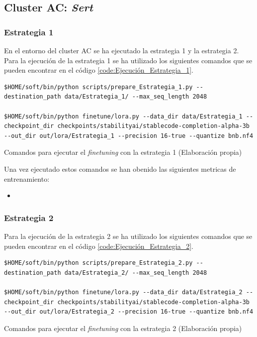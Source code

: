 \subsection{Cluster AC: \textit{Sert}}
\label{subsec:cluster_ac_ejecucion}

\subsubsection{Estrategia 1}
\label{subsubsec:cluster_ac_ejecucion:estrategia_1}

En el entorno del cluster AC se ha ejecutado la estrategia 1 y la estrategia 2. Para la
ejecución de la estrategia 1 se ha utilizado los siguientes comandos que se pueden encontrar
en el código \ref{code:Ejecución_Estrategia_1}.

\begin{mycode}
    \begin{verbatim}
$HOME/soft/bin/python scripts/prepare_Estrategia_1.py --destination_path data/Estrategia_1/ --max_seq_length 2048

$HOME/soft/bin/python finetune/lora.py --data_dir data/Estrategia_1 --checkpoint_dir checkpoints/stabilityai/stablecode-completion-alpha-3b --out_dir out/lora/Estrategia_1 --precision 16-true --quantize bnb.nf4
    \end{verbatim}
    \caption[Comandos para ejecutar el \textit{finetuning} con la estrategia 1]{Comandos para ejecutar el \textit{finetuning} con la estrategia 1 (Elaboración propia)}
    \label{code:Ejecución_Estrategia_1}
\end{mycode}

Una vez ejecutado estos comandos se han obenido las siguientes metricas de entrenamiento:

\begin{itemize}
    \item 
\end{itemize}

\subsubsection{Estrategia 2}
\label{subsubsec:cluster_ac_ejecucion:estrategia_2}

Para la ejecución de la estrategia 2 se ha utilizado los siguientes comandos que se
pueden encontrar en el código \ref{code:Ejecución_Estrategia_2}.

\begin{mycode}
    \begin{verbatim}
$HOME/soft/bin/python scripts/prepare_Estrategia_2.py --destination_path data/Estrategia_2/ --max_seq_length 2048

$HOME/soft/bin/python finetune/lora.py --data_dir data/Estrategia_2 --checkpoint_dir checkpoints/stabilityai/stablecode-completion-alpha-3b --out_dir out/lora/Estrategia_2 --precision 16-true --quantize bnb.nf4
\end{verbatim}
    \caption[Comandos para ejecutar el \textit{finetuning} con la estrategia 2]{Comandos para ejecutar el \textit{finetuning} con la estrategia 2 (Elaboración propia)}
    \label{code:Ejecución_Estrategia_2}
\end{mycode}

